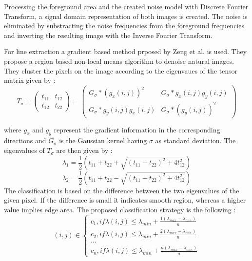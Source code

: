 \documentclass[draft,final]{vutinfth} %
\begin{document}
Processing the foreground area and the created noise model with Discrete Fourier Transform, a signal domain representation  of both images is created.
The noise is eliminated by substracting the noise frequencies from the foreground frequencies and inverting the resulting image with the Inverse Fourier Transform.
\par
For line extraction a gradient based method prposed by Zeng et al. \cite{zeng2011region} is used.
They propose a region based non-local means algorithm to denoise natural images.
They cluster the pixels on the image according to the eigenvaues of the tensor matrix given by \cite{zeng2011region}:
\[T_\sigma = 
\begin{pmatrix}
t_{11} & t_{12} \\
t_{12} & t_{22}
\end{pmatrix}
=
\begin{pmatrix}
G_\sigma*(g_x(i,j))^2 & G_{\sigma}*g_x(i, j)g_y(i, j)\\
G_{\sigma}*g_y(i, j)g_x(i, j) & G_{\sigma}*(g_y(i, j))^2
\end{pmatrix}
\]

where $g_x$ and $g_y$ represent the gradient information in the corresponding directions and $G_\sigma$ is the Gaussian kernel having $\sigma$ as standard deviation.
The eigenvalues of $T_\sigma$ are then given by \cite{zeng2011region}:
\[\lambda_1 = \frac{1}{2}(t_{11} + t_{22} + \sqrt{(t_{11}-t_{22})^2 + 4t_{12}^2})\]  
\[\lambda_2 = \frac{1}{2}(t_{11} + t_{22} - \sqrt{(t_{11}-t_{22})^2 + 4t_{12}^2})\]  
\label{eig}
The classification is based on the difference between the two eigenvalues of the given pixel.
If the difference is small it indicates smooth region, whereas a higher value implies edge area.
The proposed classification strategy is the following \cite{zeng2011region}:
\[
(i, j)\in \left\{
                \begin{array}{ll}
                  c_1, if \lambda(i,j) \leq \lambda_{min} + \frac{1(\lambda_{max} - \lambda_{min})}{n}\\
                  c_2, if \lambda(i,j) \leq \lambda_{min} + \frac{2(\lambda_{max} - \lambda_{min})}{n}\\
				... \\
                   c_n, if \lambda(i,j) \leq \lambda_{min} + \frac{n(\lambda_{max} - \lambda_{min})}{n}
                \end{array}
              \right.
\]
\end{document}

